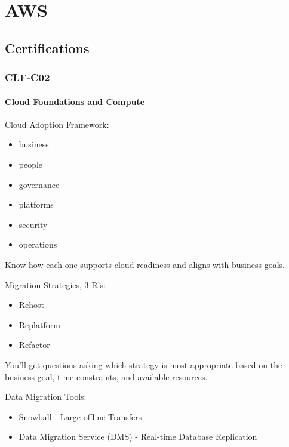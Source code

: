 
\chapter{AWS}

\section{Certifications}

\subsection{CLF-C02}

\subsubsection{Cloud Foundations and Compute}

Cloud Adoption Framework:

\begin{itemize}
    \item business
    \item people
    \item governance
    \item platforms
    \item security
    \item operations
\end{itemize}

Know how each one supports cloud readiness and aligns
with business goals.

Migration Strategies, 3 R's:

\begin{itemize}
    \item Rehost
    \item Replatform
    \item Refactor
\end{itemize}

You'll get questions asking which strategy is most
appropriate based on the business goal, time constraints,
and available resources.

Data Migration Tools:

\begin{itemize}
    \item Snowball - Large offline Transfers
    \item Data Migration Service (DMS) - Real-time Database Replication
\end{itemize}

